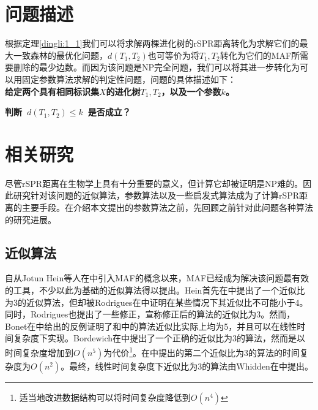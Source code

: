 \section{问题描述}\label{problem}
根据定理\ref{dingli:1_1}我们可以将求解两棵进化树的rSPR距离转化为求解它们的最大一致森林的最优化问题，$d(T_1,T_2)$也可等价为将$T_1,T_2$转化为它们的MAF所需要删除的最少边数。而因为该问题是NP完全问题，我们可以将其进一步转化为可以用固定参数算法求解的判定性问题，问题的具体描述如下：
\\

\textbf{给定两个具有相同标识集$X$的进化树$T_1,T_2$，以及一个参数$k$。}

\textbf{判断~$d(T_1,T_2) \le k$~是否成立？}
\clearpage

\section{相关研究}
尽管rSPR距离在生物学上具有十分重要的意义，但计算它却被证明是NP难的。因此研究针对该问题的近似算法，参数算法以及一些启发式算法成为了计算rSPR距离的主要手段。在介绍本文提出的参数算法之前，先回顾之前针对此问题各种算法的研究进展。

\subsection{近似算法}
自从Jotun Hein等人在\cite{hein1996complexity}中引入MAF的概念以来，MAF已经成为解决该问题最有效的工具，不少以此为基础的近似算法得以提出。Hein首先在\cite{hein1996complexity}中提出了一个近似比为3的近似算法，但却被Rodrigues在\cite{rodrigues2007maximum}中证明在某些情况下其近似比不可能小于4。同时，Rodrigues也提出了一些修正，宣称修正后的算法的近似比为3。然而，Bonet在\cite{bonet2006approximating}中给出的反例证明了\cite{hein1996complexity}和\cite{rodrigues2007maximum}中的算法近似比实际上均为5，并且可以在线性时间复杂度下实现。Bordewich在\cite{bordewich20083}中提出了一个正确的近似比为3的算法，然而是以时间复杂度增加到$O(n^5)$为代价\footnote{适当地改进数据结构可以将时间复杂度降低到$O(n^4)$}。在\cite{rodrigues2007maximum}中提出的第二个近似比为3的算法的时间复杂度为$O(n^2)$。最终，线性时间复杂度下近似比为3的算法由Whidden在\cite{whidden2009unifying}中提出。                                                                                                                                                                                                                                                             
